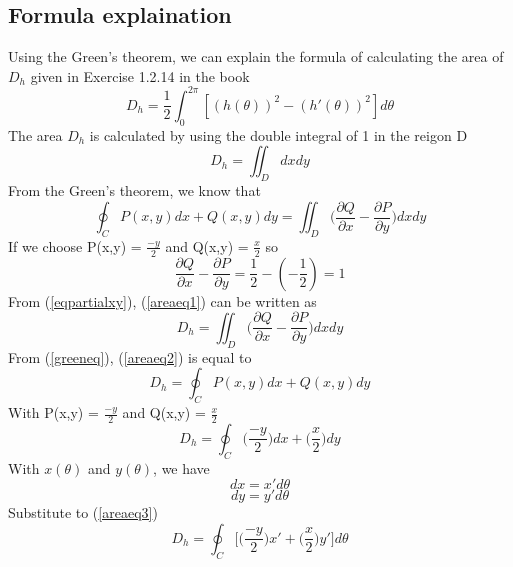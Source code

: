 \documentclass[a4paper]{article}
\begin{document}
\subsection{Formula explaination}
Using the Green's theorem, we can explain the formula of calculating the area of $D_h$ given in Exercise 1.2.14 in the book 
\begin{equation*}
    D_h = \frac{1}{2}\int^{2\pi}_0\left[(h(\theta))^2 - (h'(\theta))^2\right]d\theta 
\end{equation*}
The area $D_h$ is calculated by using the double integral of 1 in the reigon D
\begin{equation}\label{areaeq1}
    D_h = \iint_{D}dxdy
\end{equation}
From the Green's theorem, we know that
\begin{equation}\label{greeneq}
    \oint_C P(x,y)dx + Q(x,y)dy = \iint_{D} \bigg(\frac{\partial Q}{\partial x} - \frac{\partial P}{\partial y}\bigg)dxdy
\end{equation}
If we choose P(x,y) = $\frac{-y}{2}$ and Q(x,y) = $\frac{x}{2}$ so
\begin{equation}\label{eqpartialxy}
    \frac{\partial Q}{\partial x} - \frac{\partial P}{\partial y}= \frac{1}{2} - (-\frac{1}{2}) = 1
\end{equation}
From (\ref{eqpartialxy}), (\ref{areaeq1}) can be written as
\begin{equation}\label{areaeq2}
    D_h = \iint_D \bigg(\frac{\partial Q}{\partial x} - \frac{\partial P}{\partial y}\bigg)dxdy
\end{equation}
From (\ref{greeneq}), (\ref{areaeq2}) is equal to
\begin{equation}
    D_h = \oint_C P(x,y)dx + Q(x,y)dy
\end{equation}
With P(x,y) = $\frac{-y}{2}$ and Q(x,y) = $\frac{x}{2}$
\begin{equation}\label{areaeq3}
    D_h = \oint_C \bigg(\frac{-y}{2}\bigg)dx + \bigg(\frac{x}{2}\bigg)dy
\end{equation}
With $x(\theta)$ and $y(\theta)$, we have
\begin{equation*}
    dx = x'd\theta
\end{equation*}
\begin{equation*}
    dy = y'd\theta
\end{equation*}
Substitute to (\ref{areaeq3})
\begin{equation*}
    D_h = \oint_C \bigg[\bigg(\frac{-y}{2}\bigg)x' + \bigg(\frac{x}{2}\bigg)y'\bigg]d\theta
\end{equation*}
\end{document}
